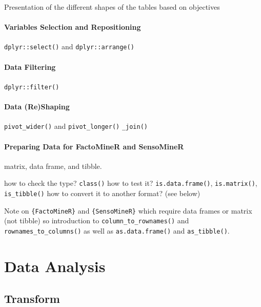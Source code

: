 \documentclass[
]{book}
\begin{document}
Presentation of the different shapes of the tables based on objectives

\hypertarget{variables-selection-and-repositioning}{%
\subsubsection{Variables Selection and Repositioning}\label{variables-selection-and-repositioning}}

\texttt{dplyr::select()} and \texttt{dplyr::arrange()}

\hypertarget{data-filtering}{%
\subsubsection{Data Filtering}\label{data-filtering}}

\texttt{dplyr::filter()}

\hypertarget{data-reshaping}{%
\subsubsection{Data (Re)Shaping}\label{data-reshaping}}

\texttt{pivot\_wider()} and \texttt{pivot\_longer()}
\texttt{\_join()}

\hypertarget{preparing-data-for-factominer-and-sensominer}{%
\subsubsection{Preparing Data for FactoMineR and SensoMineR}\label{preparing-data-for-factominer-and-sensominer}}

matrix, data frame, and tibble.

how to check the type? \texttt{class()}
how to test it? \texttt{is.data.frame()}, \texttt{is.matrix()}, \texttt{is\_tibble()}
how to convert it to another format? (see below)

Note on \texttt{\{FactoMineR\}} and \texttt{\{SensoMineR\}} which require data frames or matrix (not tibble) so introduction to \texttt{column\_to\_rownames()} and \texttt{rownames\_to\_columns()} as well as \texttt{as.data.frame()} and \texttt{as\_tibble()}.

\hypertarget{data-analysis}{%
\chapter{Data Analysis}\label{data-analysis}}

\hypertarget{transform-1}{%
\section{Transform}\label{transform-1}}
\end{document}
